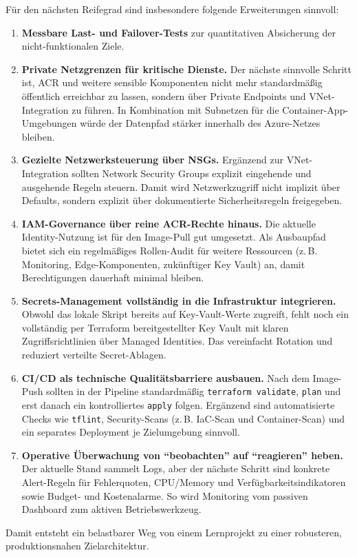 \documentclass[a4paper,11pt]{article}
\begin{document}
Für den nächsten Reifegrad sind insbesondere folgende Erweiterungen sinnvoll:
\begin{enumerate}
  \item \textbf{Messbare Last- und Failover-Tests} zur quantitativen Absicherung der nicht-funktionalen Ziele.
  \item \textbf{Private Netzgrenzen für kritische Dienste.} Der nächste sinnvolle Schritt ist, ACR und weitere sensible Komponenten nicht mehr standardmäßig öffentlich erreichbar zu lassen, sondern über Private Endpoints und VNet-Integration zu führen. In Kombination mit Subnetzen für die Container-App-Umgebungen würde der Datenpfad stärker innerhalb des Azure-Netzes bleiben.
  \item \textbf{Gezielte Netzwerksteuerung über NSGs.} Ergänzend zur VNet-Integration sollten Network Security Groups explizit eingehende und ausgehende Regeln steuern. Damit wird Netzwerkzugriff nicht implizit über Defaults, sondern explizit über dokumentierte Sicherheitsregeln freigegeben.
  \item \textbf{IAM-Governance über reine ACR-Rechte hinaus.} Die aktuelle Identity-Nutzung ist für den Image-Pull gut umgesetzt. Als Ausbaupfad bietet sich ein regelmäßiges Rollen-Audit für weitere Ressourcen (z.\,B. Monitoring, Edge-Komponenten, zukünftiger Key Vault) an, damit Berechtigungen dauerhaft minimal bleiben.
  \item \textbf{Secrets-Management vollständig in die Infrastruktur integrieren.} Obwohl das lokale Skript bereits auf Key-Vault-Werte zugreift, fehlt noch ein vollständig per Terraform bereitgestellter Key Vault mit klaren Zugriffsrichtlinien über Managed Identities. Das vereinfacht Rotation und reduziert verteilte Secret-Ablagen.
  \item \textbf{CI/CD als technische Qualitätsbarriere ausbauen.} Nach dem Image-Push sollten in der Pipeline standardmäßig \texttt{terraform validate}, \texttt{plan} und erst danach ein kontrolliertes \texttt{apply} folgen. Ergänzend sind automatisierte Checks wie \texttt{tflint}, Security-Scans (z.\,B. IaC-Scan und Container-Scan) und ein separates Deployment je Zielumgebung sinnvoll.
  \item \textbf{Operative Überwachung von ``beobachten'' auf ``reagieren'' heben.} Der aktuelle Stand sammelt Logs, aber der nächste Schritt sind konkrete Alert-Regeln für Fehlerquoten, CPU/Memory und Verfügbarkeitsindikatoren sowie Budget- und Kostenalarme. So wird Monitoring vom passiven Dashboard zum aktiven Betriebswerkzeug.
\end{enumerate}

Damit entsteht ein belastbarer Weg von einem Lernprojekt zu einer robusteren, produktionsnahen Zielarchitektur.
\end{document}
